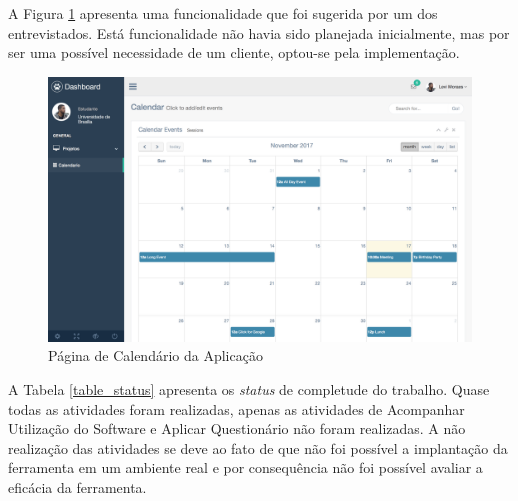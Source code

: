 A Figura \ref{img:pag_calendario} apresenta uma funcionalidade que foi sugerida por um dos entrevistados. Está funcionalidade não havia sido planejada inicialmente, mas por ser uma possível necessidade de um cliente, optou-se pela implementação. 

\graphicspath{{figuras/}}
\begin{figure}[h]
\centering
\includegraphics[scale=0.35]{calendario}
\caption{Página de Calendário da Aplicação}
\label{img:pag_calendario}
\end{figure}


A Tabela \ref{table_status} apresenta os \textit{status} de completude do trabalho. Quase todas as atividades foram realizadas, apenas as atividades de Acompanhar Utilização do Software e Aplicar Questionário não foram realizadas. A não realização das atividades se deve ao fato de que não foi possível a implantação da ferramenta em um ambiente real e por consequência não foi possível avaliar a eficácia da ferramenta.


